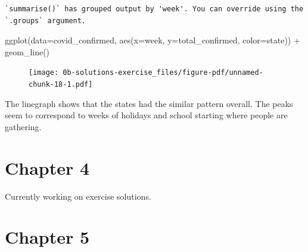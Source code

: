 \documentclass[
  letterpaper,
  DIV=11,
  numbers=noendperiod]{scrreprt}
\newenvironment{Shaded}{\begin{snugshade}}{\end{snugshade}}
\newcommand{\AttributeTok}[1]{\textcolor[rgb]{0.40,0.45,0.13}{#1}}
\newcommand{\FunctionTok}[1]{\textcolor[rgb]{0.28,0.35,0.67}{#1}}
\newcommand{\NormalTok}[1]{\textcolor[rgb]{0.00,0.23,0.31}{#1}}
\newcommand{\SpecialCharTok}[1]{\textcolor[rgb]{0.37,0.37,0.37}{#1}}
\theoremstyle{definition}
\theoremstyle{remark}
\begin{document}
\begin{verbatim}
`summarise()` has grouped output by 'week'. You can override using the
`.groups` argument.
\end{verbatim}

\begin{Shaded}
\begin{Highlighting}[]
\FunctionTok{ggplot}\NormalTok{(}\AttributeTok{data=}\NormalTok{covid\_confirmed, }
       \FunctionTok{aes}\NormalTok{(}\AttributeTok{x=}\NormalTok{week, }\AttributeTok{y=}\NormalTok{total\_confirmed, }\AttributeTok{color=}\NormalTok{state)) }\SpecialCharTok{+}
  \FunctionTok{geom\_line}\NormalTok{()}
\end{Highlighting}
\end{Shaded}

\begin{figure}[H]

{\centering \texttt{[image: 0b-solutions-exercise\_files/figure-pdf/unnamed-chunk-18-1.pdf]}

}

\end{figure}

The linegraph shows that the states had the similar pattern overall. The
peaks seem to correspond to weeks of holidays and school starting where
people are gathering.

\hypertarget{sec-ex04-sol}{%
\section{Chapter 4}\label{sec-ex04-sol}}

\begin{tcolorbox}[enhanced jigsaw, colback=white, toprule=.15mm, bottomrule=.15mm, titlerule=0mm, title=\textcolor{quarto-callout-caution-color}{\faFire}\hspace{0.5em}{Under Construction}, leftrule=.75mm, arc=.35mm, left=2mm, colframe=quarto-callout-caution-color-frame, coltitle=black, opacitybacktitle=0.6, bottomtitle=1mm, colbacktitle=quarto-callout-caution-color!10!white, opacityback=0, toptitle=1mm, rightrule=.15mm, breakable]

Currently working on exercise solutions.

\end{tcolorbox}

\hypertarget{sec-ex05-sol}{%
\section{Chapter 5}\label{sec-ex05-sol}}
\end{document}
